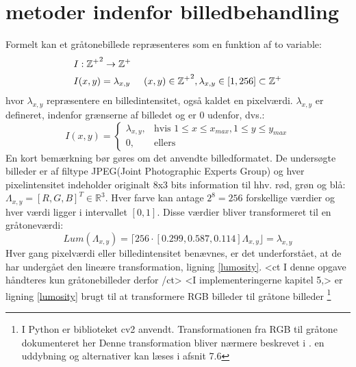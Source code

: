 \section{metoder indenfor billedbehandling}\label{subsec:kant}
Formelt kan et gråtonebillede repræsenteres som en funktion af to variable:
\begin{equation}
\begin{split}
&I: \mathbb{\mathbb{Z^+}}^2 \rightarrow \mathbb{Z}^+ \\
&I(x,y) = \lambda_{x,y} \hspace{0.5 cm} (x,y)\in \mathbb{Z^+}^2, \lambda_{x,y} \in [1,256] \subset \mathbb{Z^+}
\end{split}
\label{bf}
\end{equation}
hvor $\lambda_{x,y}$ repræsentere en billedintensitet, også kaldet en pixelværdi. $\lambda_{x,y}$ er defineret, indenfor grænserne af billedet og er 0 udenfor, dvs.: 
\begin{equation}
 I(x, y) =
\begin{cases}
    \lambda_{x,y}, & \text{hvis } 1 \leq x \leq x_{max}, 1 \leq y \leq y_{max} \\
    0,              & \text{ellers}
    \label{pixelintensitet}
\end{cases}
\end{equation}
En kort bemærkning bør gøres om det anvendte billedformatet. De undersøgte billeder er af filtype JPEG(Joint Photographic Experts Group) og hver pixelintensitet indeholder originalt 8x3 bits information til hhv. rød, grøn og blå: $\Lambda_{x,y} = [R,G,B]^T \in \mathbb{R}^3$. Hver farve kan antage $2^8 = 256$ forskellige værdier og hver værdi ligger i intervallet $[0,1]$. Disse værdier bliver transformeret til en gråtoneværdi:
\begin{equation}
Lum(\Lambda_{x,y}) = \lceil	 256 \cdot [0.299, 0.587, 0.114] \Lambda_{x,y} \rfloor	 = \lambda_{x,y}
\label{lumosity}
\end{equation}  
Hver gang pixelværdi eller billedintensitet benævnes, er det underforstået, at de har undergået den lineære transformation, ligning \eqref{lumosity}. <ct I denne opgave håndteres kun gråtonebilleder derfor /ct> <I implementeringerne kapitel 5,> er ligning \eqref{lumosity} brugt til at transformere RGB billeder til gråtone billeder \footnote{I Python er biblioteket cv2 anvendt. Transformationen fra RGB til gråtone dokumenteret her %
Denne transformation bliver nærmere beskrevet i \cite{lumosity}. en uddybning og alternativer kan læses i afsnit 7.6} 
